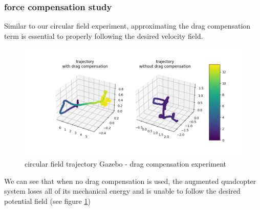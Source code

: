 \subsubsection{force compensation study}
Similar to our circular field experiment, approximating the drag compensation term is essential to properly following the desired velocity field. 
\begin{figure}[h!]
   \centering
   \includegraphics[width=\linewidth]{Images/gazebo_trajectory_fcomp_potential.png}
   \caption{circular field trajectory Gazebo - drag compensation experiment}
   \label{fig:trajgazebopotentialfcomp}
\end{figure}
We can see that when no drag compensation is used, the augmented quadcopter system loses all of its mechanical energy and is unable to follow the desired potential field (see figure \ref{fig:trajgazebopotentialfcomp})
